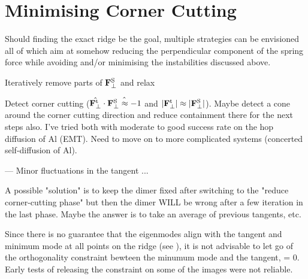 \section{Minimising Corner Cutting \pending}
\label{sec:erm-corner-cutting}

Should finding the exact ridge be the goal, multiple strategies can be envisioned all of which aim at somehow reducing the perpendicular component of the spring force while avoiding and/or minimising the instabilities discussed above.

\bit
\item Iteratively remove parts of ${\mathrm{\mathbf{\bm{F}}}}^\text{S}_\perp$ and relax
\item Detect corner cutting ($\hat{{\mathrm{\mathbf{\bm{F}}}}^\text{t}_\perp} \cdot \hat{{\mathrm{\mathbf{\bm{F}}}}^\text{S}_\perp \approx -1}$ and $|{\mathrm{\mathbf{\bm{F}}}}^\text{t}_\perp| \approx |{\mathrm{\mathbf{\bm{F}}}}^\text{S}_\perp|$). Maybe detect a cone around the corner cutting direction and reduce containment there for the next steps also.
\eit
I've tried both with moderate to good success rate on the hop diffusion of Al (EMT).
Need to move on to more complicated systems (concerted self-diffusion of Al).

--- Minor fluctuations in the tangent ... 

A possible "solution" is to keep the dimer fixed after switching to the "reduce corner-cutting phase" but then the dimer WILL be wrong after a few iteration in the last phase.
Maybe the answer is to take an average of previous tangents, etc.

Since there is no guarantee that the eigenmodes align with the tangent and minimum mode at all points on the ridge (see ), it is not advisable to let go of the orthogonality constraint bewteen the minumum mode and the tangent,
\uvn \cdot \uvt = 0.
\eeq
Early tests of releasing the constraint on some of the images were not reliable.

\incomplete
